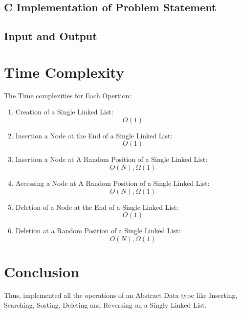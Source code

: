 \documentclass[11pt]{article}
\begin{document}
\subsection{C Implementation of Problem Statement}



\subsection{Input and Output}


\section{Time Complexity}
The Time complexities for Each Opertion: 
\begin{enumerate}
	\item Creation of a Single Linked List: 
	$$O(1)$$
	\item Insertion a Node at the End of a Single Linked List: 
	$$O(1)$$
	\item Insertion a Node at A Random Position of a Single Linked List: 
	$$O(N), \Omega(1)$$
	\item Accessing a Node at A Random Position of a Single Linked List: 
	$$O(N), \Omega(1)$$
	\item Deletion of a Node at the End of a Single Linked List: 
	$$O(1)$$
	\item Deletion at a Random Position of a Single Linked List: 
	$$O(N), \Omega(1)$$
\end{enumerate}
\section{Conclusion}
Thus, implemented all the operations of an Abstract Data type like Inserting, Searching, Sorting, Deleting and Reversing on a Singly Linked List.
\end{document}
